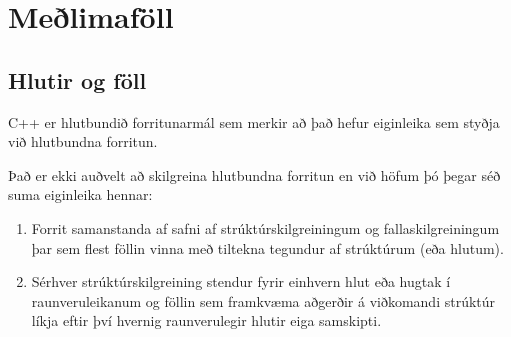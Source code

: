 





\chapter{Meðlimaföll}

\section{Hlutir og föll}

C++ er hlutbundið forritunarmál sem merkir að það hefur eiginleika sem styðja við hlutbundna forritun.

Það er ekki auðvelt að skilgreina hlutbundna forritun en við höfum þó þegar séð suma eiginleika hennar:

\begin{enumerate}

\item Forrit samanstanda af safni af strúktúrskilgreiningum og fallaskilgreiningum 
þar sem flest föllin vinna með tiltekna tegundur af strúktúrum (eða hlutum).

\item Sérhver strúktúrskilgreining stendur fyrir einhvern hlut eða hugtak í raunveruleikanum og föllin sem framkvæma aðgerðir á viðkomandi strúktúr
líkja eftir því hvernig raunverulegir hlutir eiga samskipti.

\end{enumerate}

